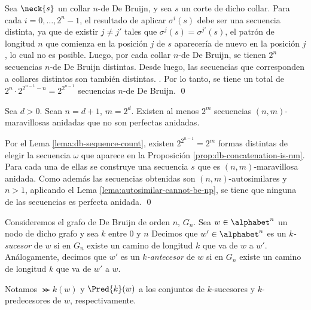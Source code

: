 \begin{demo}
  Sea $\neck{s}$ un collar $n$-de De Bruijn, y sea $s$ un corte de dicho
  collar. Para cada $i = 0,\dots,2^n-1$, el resultado de aplicar $\sigma^i(s)$
  debe ser una secuencia distinta, ya que de existir $j \neq j'$ tales que
  $\sigma^j(s) = \sigma^{j'}(s)$, el patrón de longitud $n$ que comienza en la
  posición $j$ de $s$ aparecería de nuevo en la posición $j$, lo cual no es
  posible. Luego, por cada collar $n$-de De Bruijn, se tienen $2^n$ secuencias
  $n$-de De Bruijn distintas. Desde luego, las secuencias que corresponden a
  collares distintos son también distintas. 
.
Por lo tanto, se tiene un total de
  $2^n \cdot 2^{2^{n-1}-n} = 2^{2^{n-1}}$ secuencias $n$-de De Bruijn. \qed
\end{demo}


\begin{teo}
  Sea $d > 0$. Sean $n = d + 1$, $m = 2^d$. Existen al menos $2^m$
  secuencias $(n, m)$-maravillosas anidadas que no son perfectas anidadas.
\end{teo}

\begin{demo}
  Por el Lema \ref{lema:db-sequence-count}, existen $2^{2^{n-1}} = 2^m$ formas
  distintas de elegir la secuencia $\omega$ que aparece en la Proposición
  \ref{prop:db-concatenation-is-nm}. Para cada una de ellas se construye una
  secuencia $s$ que es $(n, m)$-maravillosa anidada. Como además las
  secuencias obtenidas son $(n,m)$-autosimilares y $n > 1$, aplicando el Lema
  \ref{lema:autosimilar-cannot-be-np}, se tiene que ninguna de las secuencias
  es perfecta anidada. \qed
{}
\end{demo}

\begin{defi}
  Consideremos el grafo de De Bruijn de orden $n$, $G_n$. Sea $w \in
    \alphabet^n$ un nodo  de dicho grafo
 y sea $k$ entre $0$ y $n$
  Decimos que $w' \in \alphabet^n$ es un \emph{$k$-sucesor} de $w$ si en $G_n$
  existe un camino de longitud $k$ que va de $w$ a $w'$.
  Análogamente, decimos que $w'$ es un \emph{$k$-antecesor} de $w$ si en $G_n$
  existe un camino de longitud $k$ que va de $w'$ a $w$.

  Notamos $\Succ{k}(w)$ y $\Pred{k}(w)$ a los conjuntos de $k$-sucesores y
  $k$-predecesores de $w$, respectivamente.
\end{defi}

